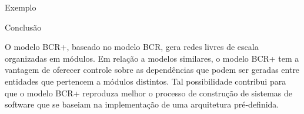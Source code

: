 \begin{section}{Exemplo}



\end{section}

\begin{section}{Conclusão}
	
	O modelo BCR+, baseado no modelo BCR, gera redes livres de escala organizadas em módulos. Em relação a modelos similares, o modelo BCR+ tem a vantagem de oferecer controle sobre as dependências que podem ser geradas entre entidades que pertencem a módulos distintos. Tal possibilidade contribui para que o modelo BCR+ reproduza melhor o processo de construção de sistemas de software que se baseiam na implementação de uma arquitetura pré-definida.
	
\end{section}